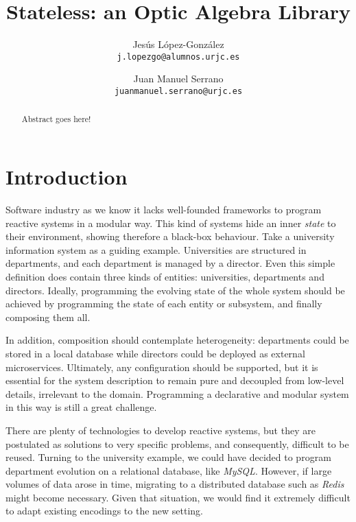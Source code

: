 \documentclass[a4paper]{article}
\begin{document}
\lstset{language=scala}

\title{Stateless: an Optic Algebra Library}
\author{
  Jesús López-González\\
  \texttt{j.lopezgo@alumnos.urjc.es}
  \and
  Juan Manuel Serrano\\
  \texttt{juanmanuel.serrano@urjc.es}
}

\maketitle

\begin{abstract}

  Abstract goes here!

\end{abstract}

\section{Introduction}


Software industry as we know it lacks well-founded frameworks to program
reactive systems in a modular way. This kind of systems hide an inner
\emph{state} to their environment, showing therefore a black-box behaviour. Take
a university information system as a guiding example. Universities are
structured in departments, and each department is managed by a director. Even
this simple definition does contain three kinds of entities: universities,
departments and directors. Ideally, programming the evolving state of the whole
system should be achieved by programming the state of each entity or subsystem,
and finally composing them all.

In addition, composition should contemplate heterogeneity: departments could be
stored in a local database while directors could be deployed as external
microservices. Ultimately, any configuration should be supported, but it is
essential for the system description to remain pure and decoupled from low-level
details, irrelevant to the domain. Programming a declarative and modular system
in this way is still a great challenge.


There are plenty of technologies to develop reactive systems, but they are
postulated as solutions to very specific problems, and consequently, difficult
to be reused. Turning to the university example, we could have decided to
program department evolution on a relational database, like \emph{MySQL}.
However, if large volumes of data arose in time, migrating to a distributed
database such as \emph{Redis} might become necessary. Given that situation, we
would find it extremely difficult to adapt existing encodings to the new
setting.
\end{document}
